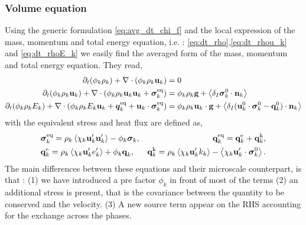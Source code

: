 \subsubsection{Volume equation}
Using the generic formulation \ref{eq:avg_dt_chi_f} and the local expression of the mass, momentum and total energy equation, i.e. : \ref{eq:dt_rho},\ref{eq:dt_rhou_k} and \ref{eq:dt_rhoE_k} we easily find the averaged form of the mass, momentum and total energy equation.
They read, 
\begin{align}
    \label{eq:dt_avg_rho}
    \partial_t (\phi_k \rho_k)  
    + \mathbf{\nabla}\cdot (
        \phi_k \rho_k\textbf{u}_k
    )
    &= 
    0\\
    \label{eq:dt_avg_rhou_k}
    \partial_t (\phi_k \rho_k\textbf{u}_k)  
    + \mathbf{\nabla}\cdot (
        \phi_k \rho_k\textbf{u}_k\textbf{u}_k
        + \bm{\sigma}_k^\text{eq}
    )
    &= 
    \phi_k \rho_k \textbf{g} 
    +  \left<\delta_I \bm{\sigma}_k^0 \cdot \textbf{n}_k\right>\\
    \label{eq:dt_avg_rhoE_k}
    \partial_t (\phi_k\rho_kE_k)  
    + \mathbf{\nabla}\cdot (
        \phi_k\rho_kE_k\textbf{u}_k
        + \bm{q}_k^\text{eq}
        + \textbf{u}_k \cdot \bm{\sigma}_k^\text{eq}
        )
    &= 
    \phi_k \rho_k\textbf{u}_k \cdot \textbf{g} 
    + \left<\delta_I (\textbf{u}_k^0 \cdot \bm{\sigma}_k^0 - \textbf{q}_k^0)\cdot \textbf{n}_k\right>
\end{align} 
with the equivalent stress and heat flux are defined as, 
\begin{align*}
    &\bm{\sigma}_k^\text{eq}
    = 
     \rho_k\avg{\chi_k \textbf{u}_k'\textbf{u}_k'}
      - \phi_k \bm{\sigma}_k,%
    &\textbf{q}_k^\text{eq}
    =\textbf{q}_k^\text{e} +\textbf{q}_k^\text{k},  \\
    &\textbf{q}_k^\text{e}
    = \rho_k \avg{\chi_k\textbf{u}_k' e_k'} 
    + \phi_k\textbf{q}_k,
    &\textbf{q}_k^\text{k}
    = \rho_k \avg{\chi_k \textbf{u}_k' k_k} 
    - \avg{\chi_k \textbf{u}_k' \cdot \bm{\sigma}_k^0}.
\end{align*}
The main differences between these equations and their microscale counterpart, is that : (1) we have introduced a pre factor $\phi_k$ in front of most of the terms
(2) an additional stress is present, that is the covariance between the quantity to be conserved and the velocity. 
(3) A new source term appear on the RHS accounting for the exchange across the phases. 

